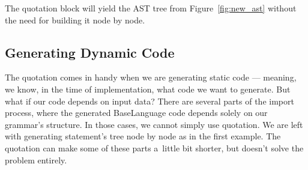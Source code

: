 The quotation block will yield the AST tree from Figure~\ref{fig:new_ast} without the need for building it node by node.

\subsection{Generating Dynamic Code}

The quotation comes in handy when we are generating static code --- meaning, we know, in the time of implementation, what code we want to generate.
But what if our code depends on input data?
There are several parts of the import process, where the generated BaseLanguage code depends solely on our grammar's structure.
In those cases, we cannot simply use quotation.
We are left with generating statement's tree node by node as in the first example.
The quotation can make some of these parts a~little bit shorter, but doesn't solve the problem entirely.